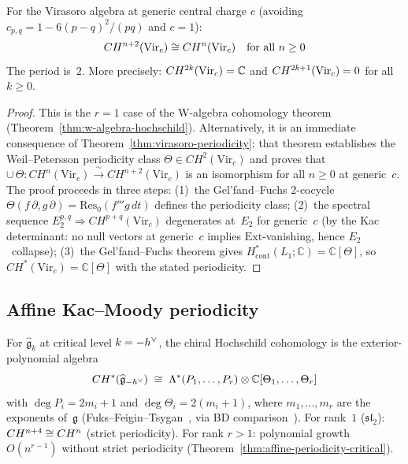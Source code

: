 \begin{theorem}\label{thm:virasoro-hochschild}
For the Virasoro algebra at generic central charge $c$ (avoiding
$c_{p,q} = 1 - 6(p-q)^2/(pq)$ and $c = 1$):
\[CH^{n+2}(\mathrm{Vir}_c) \cong CH^n(\mathrm{Vir}_c)
\quad \text{for all } n \geq 0\]
The period is~$2$.  More precisely:
$CH^{2k}(\mathrm{Vir}_c) = \mathbb{C}$ and
$CH^{2k+1}(\mathrm{Vir}_c) = 0$ for all $k \geq 0$.
\end{theorem}

\begin{proof}
This is the $r = 1$ case of the W-algebra cohomology theorem
(Theorem~\ref{thm:w-algebra-hochschild}).  Alternatively, it is an
immediate consequence of Theorem~\ref{thm:virasoro-periodicity}:
that theorem establishes the Weil--Petersson periodicity class
$\Theta \in CH^2(\mathrm{Vir}_c)$ and proves that
$\cup\,\Theta\colon CH^n(\mathrm{Vir}_c) \xrightarrow{\;\sim\;} CH^{n+2}(\mathrm{Vir}_c)$
is an isomorphism for all $n \geq 0$ at generic~$c$.  The proof
proceeds in three steps: (1)~the Gel'fand--Fuchs $2$-cocycle
$\Theta(f\,\partial, g\,\partial) = \mathrm{Res}_0(f'''g\,dt)$
defines the periodicity class; (2)~the spectral sequence
$E_2^{p,q} \Rightarrow CH^{p+q}(\mathrm{Vir}_c)$ degenerates at~$E_2$
for generic~$c$ (by the Kac determinant: no null vectors at generic~$c$
implies $\mathrm{Ext}$-vanishing, hence $E_2$~collapse); (3)~the
Gel'fand--Fuchs theorem \cite{FF84} gives
$H^*_{\mathrm{cont}}(L_1;\mathbb{C}) = \mathbb{C}[\Theta]$,
so $CH^*(\mathrm{Vir}_c) = \mathbb{C}[\Theta]$ with the stated
periodicity.
\end{proof}

\subsection{Affine Kac--Moody periodicity}

\begin{theorem}\label{thm:critical-level-cohomology}
For $\widehat{\mathfrak{g}}_k$ at critical level $k = -h^\vee$, the chiral Hochschild cohomology is the exterior-polynomial algebra
\[CH^*(\widehat{\mathfrak{g}}_{-h^\vee}) \;\cong\; \Lambda^*(P_1,\ldots,P_r) \otimes \mathbb{C}[\Theta_1,\ldots,\Theta_r]\]
with $\deg P_i = 2m_i + 1$ and $\deg \Theta_i = 2(m_i+1)$, where $m_1,\ldots,m_r$ are the exponents of~$\mathfrak{g}$ (Fuks--Feigin--Tsygan~\cite{FT87}, via BD comparison~\cite{BD04}).  For rank~$1$ ($\mathfrak{sl}_2$): $CH^{n+4} \cong CH^n$ (strict periodicity).  For rank $r > 1$: polynomial growth $O(n^{r-1})$ without strict periodicity (Theorem~\ref{thm:affine-periodicity-critical}).
\end{theorem}

